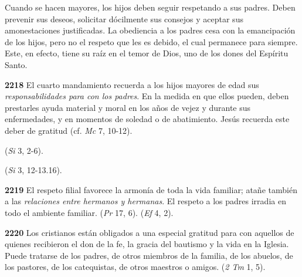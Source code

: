 \begin{body}
\begin{body}
Cuando se hacen mayores, los hijos deben seguir respetando a sus padres. Deben prevenir sus deseos, solicitar dócilmente sus consejos y aceptar sus amonestaciones justificadas. La obediencia a los padres cesa con la emancipación de los hijos, pero no el respeto que les es debido, el cual permanece para siempre. Este, en efecto, tiene su raíz en el temor de Dios, uno de los dones del Espíritu Santo.

\textbf{2218} El cuarto mandamiento recuerda a los hijos mayores de edad sus \emph{responsabilidades para con los padres}. En la medida en que ellos pueden, deben prestarles ayuda material y moral en los años de vejez y durante sus enfermedades, y en momentos de soledad o de abatimiento. Jesús recuerda este deber de gratitud (cf. \emph{Mc} 7, 10-12).

 (\emph{Si} 3, 2-6).

 (\emph{Si} 3, 12-13.16).

\textbf{2219} El respeto filial favorece la armonía de toda la vida familiar; atañe también a las \emph{relaciones entre hermanos y hermanas}. El respeto a los padres irradia en todo el ambiente familiar.  (\emph{Pr} 17, 6).  (\emph{Ef} 4, 2).

\textbf{2220} Los cristianos están obligados a una especial gratitud para con aquellos de quienes recibieron el don de la fe, la gracia del bautismo y la vida en la Iglesia. Puede tratarse de los padres, de otros miembros de la familia, de los abuelos, de los pastores, de los catequistas, de otros maestros o amigos.  (\emph{2 Tm} 1, 5).


\end{body}
\end{body}
